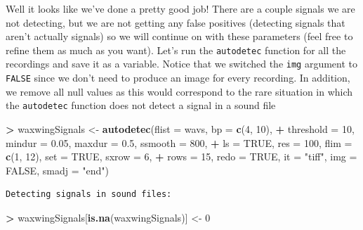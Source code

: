 \documentclass[]{krantz}
\makeatletter
\newenvironment{Shaded}{\begin{snugshade}}{\end{snugshade}}
\newcommand{\DataTypeTok}[1]{\textcolor[rgb]{0.27,0.27,0.27}{#1}}
\newcommand{\DecValTok}[1]{\textcolor[rgb]{0.06,0.06,0.06}{#1}}
\newcommand{\FloatTok}[1]{\textcolor[rgb]{0.06,0.06,0.06}{#1}}
\newcommand{\KeywordTok}[1]{\textcolor[rgb]{0.27,0.27,0.27}{\textbf{#1}}}
\newcommand{\NormalTok}[1]{#1}
\newcommand{\OperatorTok}[1]{\textcolor[rgb]{0.43,0.43,0.43}{\textbf{#1}}}
\newcommand{\OtherTok}[1]{\textcolor[rgb]{0.37,0.37,0.37}{#1}}
\newcommand{\StringTok}[1]{\textcolor[rgb]{0.5,0.5,0.5}{#1}}
\newenvironment{kframe}{%
\medskip{}
\setlength{\fboxsep}{.8em}
 \def\at@end@of@kframe{}%
 \ifinner\ifhmode%
  \def\at@end@of@kframe{\end{minipage}}%
  \begin{minipage}{\columnwidth}%
 \fi\fi%
 \def\FrameCommand##1{\hskip\@totalleftmargin \hskip-\fboxsep
 \colorbox{shadecolor}{##1}\hskip-\fboxsep
     \hskip-\linewidth \hskip-\@totalleftmargin \hskip\columnwidth}%
 \MakeFramed {\advance\hsize-\width
   \@totalleftmargin\z@ \linewidth\hsize
   \@setminipage}}%
 {\par\unskip\endMakeFramed%
 \at@end@of@kframe}
\renewenvironment{Shaded}{\begin{kframe}}{\end{kframe}}
\makeatother
\begin{document}
Well it looks like we've done a pretty good job! There are a couple signals we are not detecting, but we are not getting any false positives (detecting signals that aren't actually signals) so we will continue on with these parameters (feel free to refine them as much as you want). Let's run the \texttt{autodetec} function for all the recordings and save it as a variable. Notice that we switched the \texttt{img} argument to \texttt{FALSE} since we don't need to produce an image for every recording. In addition, we remove all null values as this would correspond to the rare situation in which the \texttt{autodetec} function does not detect a signal in a sound file

\begin{Shaded}
\begin{Highlighting}[]
\OperatorTok{>}\StringTok{ }\NormalTok{waxwingSignals <-}\StringTok{ }\KeywordTok{autodetec}\NormalTok{(}\DataTypeTok{flist =}\NormalTok{ wavs, }\DataTypeTok{bp =} \KeywordTok{c}\NormalTok{(}\DecValTok{4}\NormalTok{, }\DecValTok{10}\NormalTok{), }
\OperatorTok{+}\StringTok{   }\DataTypeTok{threshold =} \DecValTok{10}\NormalTok{, }\DataTypeTok{mindur =} \FloatTok{0.05}\NormalTok{, }\DataTypeTok{maxdur =} \FloatTok{0.5}\NormalTok{, }\DataTypeTok{ssmooth =} \DecValTok{800}\NormalTok{, }
\OperatorTok{+}\StringTok{   }\DataTypeTok{ls =} \OtherTok{TRUE}\NormalTok{, }\DataTypeTok{res =} \DecValTok{100}\NormalTok{, }\DataTypeTok{flim =} \KeywordTok{c}\NormalTok{(}\DecValTok{1}\NormalTok{, }\DecValTok{12}\NormalTok{), }\DataTypeTok{set =} \OtherTok{TRUE}\NormalTok{, }\DataTypeTok{sxrow =} \DecValTok{6}\NormalTok{, }
\OperatorTok{+}\StringTok{   }\DataTypeTok{rows =} \DecValTok{15}\NormalTok{, }\DataTypeTok{redo =} \OtherTok{TRUE}\NormalTok{, }\DataTypeTok{it =} \StringTok{"tiff"}\NormalTok{, }\DataTypeTok{img =} \OtherTok{FALSE}\NormalTok{, }\DataTypeTok{smadj =} \StringTok{"end"}\NormalTok{)}
\end{Highlighting}
\end{Shaded}

\begin{verbatim}
Detecting signals in sound files:
\end{verbatim}

\begin{Shaded}
\begin{Highlighting}[]
\OperatorTok{>}\StringTok{ }\NormalTok{waxwingSignals[}\KeywordTok{is.na}\NormalTok{(waxwingSignals)] <-}\StringTok{ }\DecValTok{0}
\end{Highlighting}
\end{Shaded}
\end{document}
